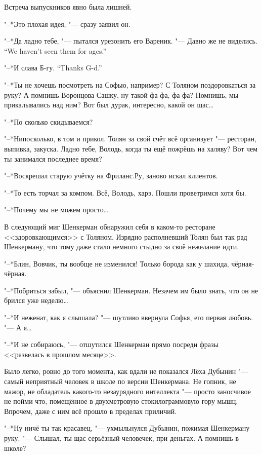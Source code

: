 Встреча выпускников явно была лишней.

"--*Это плохая идея, "--- сразу заявил он.

"--*Да ладно тебе, "--- пытался урезонить его Вареник.
{"--- Давно же не виделись.}
{``We haven't seen them for ages.''}

{"--*И слава Б-гу.}
{``Thanks G-d.''}

"--*Ты не хочешь посмотреть на Софью, например?
С Толяном поздоровкаться за руку?
А помнишь Воронцова Сашку, ну такой фа-фа, фа-фа?
Помнишь, мы прикалывались над ним?
Вот был дурак, интересно, какой он щас\ldots{}

"--*По сколько скидываемся?

"--*Нипосколько, в том и прикол.
Толян за свой счёт всё организует "--- ресторан, выпивка, закуска.
Ладно тебе, Володь, когда ты ещё пожрёшь на халяву?
Вот чем ты занимался последнее время?

"--*Воскрешал старую учётку на Фриланс.Ру, заново искал клиентов.

"--*То есть торчал за компом.
Всё, Володь, харэ.
Пошли проветримся хотя бы.

"--*Почему мы не можем просто\ldots{}

В следующий миг Шенкерман обнаружил себя в каком-то ресторане <<здоровкающимся>> с Толяном.
Изрядно располневший Толян был так рад Шенкерману, что тому даже стало немного стыдно за своё нежелание идти.

"--*Блин, Вовчик, ты вообще не изменился!
Только борода как у шахида, чёрная-чёрная.

"--*Побриться забыл, "--- объяснил Шенкерман.
Незачем им было знать, что он не брился уже неделю\ldots{}

"--*И неженат, как я слышала? "--- шутливо ввернула Софья, его первая любовь.
"--- А я\ldots{}

"--*И не собираюсь, "--- отшутился Шенкерман прямо посреди фразы <<развелась в прошлом месяце>>.

Было легко, ровно до того момента, как вдали не показался Лёха Дубынин "--- самый неприятный человек в школе по версии Шенкермана.
Не гопник, не мажор, не обладатель какого-то незаурядного интеллекта "--- просто заносчивое не пойми что, помещённое в двухметровую стокилограммовую гору мышц.
Впрочем, даже с ним всё прошло в пределах приличий.

"--*Ну ничё ты так красавец, "--- ухмыльнулся Дубынин, пожимая Шенкерману руку.
"--- Слышал, ты щас серьёзный человечек, при деньгах.
А помнишь в школе?

